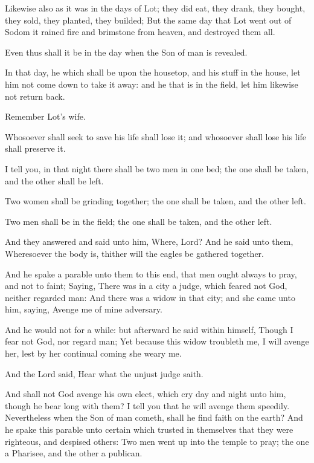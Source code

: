 \Verse Likewise also as it was in the days of Lot; they did eat, they drank, they bought, they sold, they planted, they builded; \Verse But the same day that Lot went out of Sodom it rained fire and brimstone from heaven, and destroyed them all.

\Verse Even thus shall it be in the day when the Son of man is revealed.

\Verse In that day, he which shall be upon the housetop, and his stuff in the house, let him not come down to take it away: and he that is in the field, let him likewise not return back.

\Verse Remember Lot's wife.

\Verse Whosoever shall seek to save his life shall lose it; and whosoever shall lose his life shall preserve it.

\Verse I tell you, in that night there shall be two men in one bed; the one shall be taken, and the other shall be left.

\Verse Two women shall be grinding together; the one shall be taken, and the other left.

\Verse Two men shall be in the field; the one shall be taken, and the other left.

\Verse And they answered and said unto him, Where, Lord? And he said unto them, Wheresoever the body is, thither will the eagles be gathered together.


\Chapter
\Verse And he spake a parable unto them to this end, that men ought always to pray, and not to faint; \Verse Saying, There was in a city a judge, which feared not God, neither regarded man: \Verse And there was a widow in that city; and she came unto him, saying, Avenge me of mine adversary.

\Verse And he would not for a while: but afterward he said within himself, Though I fear not God, nor regard man; \Verse Yet because this widow troubleth me, I will avenge her, lest by her continual coming she weary me.

\Verse And the Lord said, Hear what the unjust judge saith.

\Verse And shall not God avenge his own elect, which cry day and night unto him, though he bear long with them?  \Verse I tell you that he will avenge them speedily. Nevertheless when the Son of man cometh, shall he find faith on the earth?  \Verse And he spake this parable unto certain which trusted in themselves that they were righteous, and despised others: \Verse Two men went up into the temple to pray; the one a Pharisee, and the other a publican.

